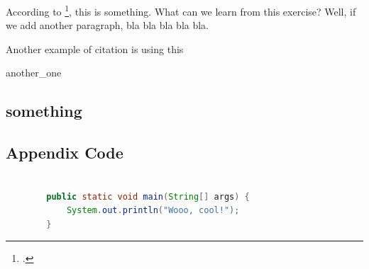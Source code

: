 \documentclass[oneside,12pt]{book}
\begin{document}
\begin{doublespace}
According to \footcite[Quote from][According to me, this is really neat]{lion2010}, this is something. What can we learn from this exercise? Well, if we add another paragraph, bla bla bla bla bla.

Another example of citation is using this \parencite[see][page 12]{wikibook}






{another_one} %


\end{doublespace}



\backmatter

\printbibliography[heading=bibintoc]


\begin{appendices}
	\chapter{something}
	
	\section{Appendix Code}
	\begin{lstlisting}[language=java, style=skripsilisting]
		
		public static void main(String[] args) {
			System.out.println("Wooo, cool!");
		}
	\end{lstlisting}
	
\end{appendices}
\end{document}
